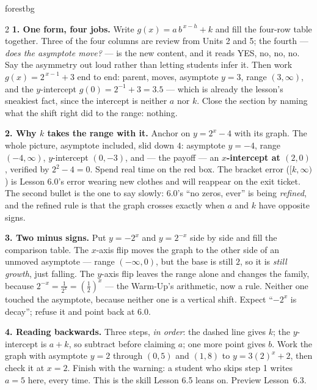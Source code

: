 \documentclass[10pt]{article}
\begin{document}
\begin{skillbox}[Lesson]{forestbg}
\begin{multicols}{2}
\textbf{1. One form, four jobs.} Write $g(x)=a\,b^{\,x-h}+k$ and fill the four-row table together.
Three of the four columns are review from Units 2 and 5; the fourth --- \emph{does the asymptote
move?} --- is the new content, and it reads YES, no, no, no. Say the asymmetry out loud rather than
letting students infer it. Then work $g(x)=2^{\,x-1}+3$ end to end: parent, moves, asymptote $y=3$,
range $(3,\infty)$, and the $y$-intercept $g(0)=2^{-1}+3=3.5$ --- which is already the lesson's
sneakiest fact, since the intercept is neither $a$ nor $k$. Close the section by naming what the
shift right did to the range: nothing.

\textbf{2. Why $k$ takes the range with it.} Anchor on $y=2^{x}-4$ with its graph. The whole picture,
asymptote included, slid down $4$: asymptote $y=-4$, range $(-4,\infty)$, $y$-intercept $(0,-3)$, and
--- the payoff --- an \textbf{$x$-intercept at $(2,0)$}, verified by $2^{2}-4=0$. Spend real time on
the red box. The bracket error ($[k,\infty)$) is Lesson 6.0's error wearing new clothes and will
reappear on the exit ticket. The second bullet is the one to say slowly: 6.0's ``no zeros, ever'' is
being \emph{refined}, and the refined rule is that the graph crosses exactly when $a$ and $k$ have
opposite signs.

\columnbreak

\textbf{3. Two minus signs.} Put $y=-2^{x}$ and $y=2^{-x}$ side by side and fill the comparison table.
The $x$-axis flip moves the graph to the other side of an unmoved asymptote --- range $(-\infty,0)$,
but the base is still $2$, so it is \emph{still growth}, just falling. The $y$-axis flip leaves the
range alone and changes the family, because $2^{-x}=\frac{1}{2^{x}}=\left(\frac12\right)^{x}$ --- the
Warm-Up's arithmetic, now a rule. Neither one touched the asymptote, because neither one is a vertical
shift. Expect ``$-2^{x}$ is decay''; refuse it and point back at 6.0.

\textbf{4. Reading backwards.} Three steps, \emph{in order}: the dashed line gives $k$; the
$y$-intercept is $a+k$, so subtract before claiming $a$; one more point gives $b$. Work the graph with
asymptote $y=2$ through $(0,5)$ and $(1,8)$ to $y=3(2)^{x}+2$, then check it at $x=2$. Finish with the
warning: a student who skips step 1 writes $a=5$ here, every time. This is the skill Lesson 6.5 leans
on. Preview Lesson~6.3.
\end{multicols}
\end{skillbox}
\end{document}

